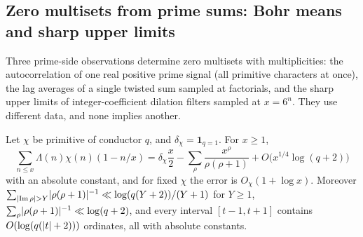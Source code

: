 \subsection{Zero multisets from prime sums: Bohr means and sharp upper limits}\label{rec:sec:prime}

Three prime-side observations determine zero multisets with multiplicities: the autocorrelation
of one real positive prime signal (all primitive characters at once), the lag averages of a
single twisted sum sampled at factorials, and the sharp upper limits of integer-coefficient
dilation filters sampled at $x=6^n$. They use different data, and none implies another.

\begin{lemma}\label{rec:lem:triangle}
Let $\chi$ be primitive of conductor $q$, and $\delta_\chi=\mathbf 1_{q=1}$. For $x\ge1$,
\begin{equation}\label{rec:eq:triangle}
 \sum_{n\le x}\Lambda(n)\chi(n)(1-n/x)=\delta_\chi\frac x2-\sum_\rho\frac{x^\rho}{\rho(\rho+1)}
 +O\bigl(x^{1/4}\log(q+2)\bigr)
\end{equation}
with an absolute constant, and for fixed $\chi$ the error is $O_\chi(1+\log x)$. Moreover
$\sum_{\lvert\operatorname{Im}\rho\rvert>Y}\lvert\rho(\rho+1)\rvert^{-1}\ll\log(q(Y+2))/(Y+1)$ for $Y\ge1$,
$\sum_\rho\lvert\rho(\rho+1)\rvert^{-1}\ll\log(q+2)$, and every interval $[t-1,t+1]$ contains
$O(\log(q(\lvert t\rvert+2)))$ ordinates, all with absolute constants.
\end{lemma}

